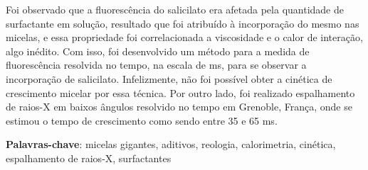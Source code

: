 \documentclass[
	12pt,				%
	openright,			%
	twoside,			%
	a4paper,			%
	english,			%
	brazil%
	]{abntex2}
\begin{document}
\begin{resumo}
	Foi observado que a fluorescência do salicilato era afetada pela quantidade de surfactante em solução, resultado que foi atribuído à incorporação do mesmo nas micelas, e essa propriedade foi correlacionada a viscosidade e o calor de interação, algo inédito. Com isso, foi desenvolvido um método para a medida de fluorescência resolvida no tempo, na escala de ms, para se observar a incorporação de salicilato. Infelizmente, não foi possível obter a cinética de crescimento micelar por essa técnica. Por outro lado, foi realizado espalhamento de raios-X em baixos ângulos resolvido no tempo em Grenoble, França, onde se estimou o tempo de crescimento como sendo entre 35 e 65 ms.
	
	
 \textbf{Palavras-chave}: micelas gigantes, aditivos, reologia, calorimetria, cinética, espalhamento de raios-X, surfactantes
\end{resumo}
\end{document}
